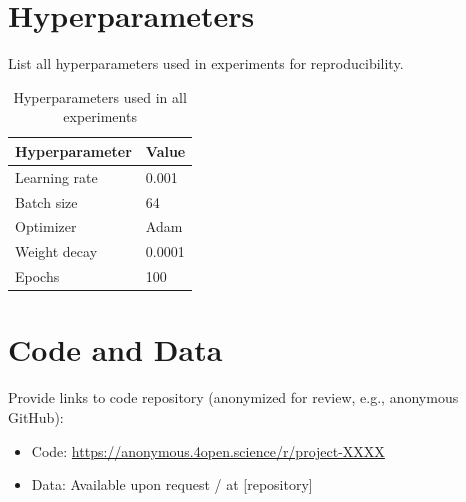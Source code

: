 \documentclass{article}
\begin{document}
\section{Hyperparameters}
\label{app:hyperparameters}

List all hyperparameters used in experiments for reproducibility.

\begin{table}[h]
\centering
\caption{Hyperparameters used in all experiments}
\begin{tabular}{ll}
\toprule
Hyperparameter & Value \\
\midrule
Learning rate & 0.001 \\
Batch size & 64 \\
Optimizer & Adam \\
Weight decay & 0.0001 \\
Epochs & 100 \\
\bottomrule
\end{tabular}
\end{table}

\section{Code and Data}
\label{app:code}

Provide links to code repository (anonymized for review, e.g., anonymous GitHub):
\begin{itemize}
    \item Code: \url{https://anonymous.4open.science/r/project-XXXX}
    \item Data: Available upon request / at [repository]
\end{itemize}


\end{document}
